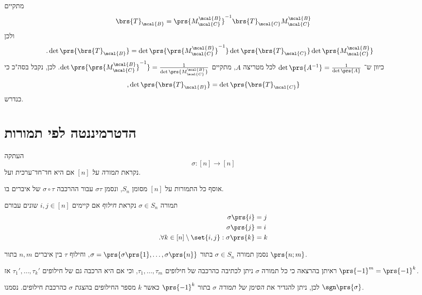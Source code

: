 \documentclass[a4paper,10pt,twoside,openany]{book}
\begin{document}
\begin{solution}
מתקיים
\begin{align*}
\brs{T}_\mcal{B} = \prs{M^\mcal{B}_\mcal{C}}^{-1} \brs{T}_\mcal{C} M^\mcal{B}_\mcal{C}
\end{align*}
ולכן
\begin{align*}
\text{.} \det\prs{\brs{T}_\mcal{B}} &= \det\prs{\prs{M^\mcal{B}_\mcal{C}}^{-1}} \det\prs{\brs{T}_\mcal{C}} \det\prs{M^\mcal{B}_\mcal{C}}
\end{align*}
כיוון ש־%
$\det\prs{A^{-1}} = \frac{1}{\det\prs{A}}$
 לכל מטריצה
 $A$,
 מתקיים
 $\det\prs{\prs{M^\mcal{B}_\mcal{C}}^{-1}} = \frac{1}{\det\prs{M^\mcal{B}_\mcal{C}}}$.
 לכן, נקבל בסה"כ כי
 \[\text{,} \det\prs{\brs{T}_\mcal{B}} = \det\prs{\brs{T}_\mcal{C}}\]
 כנדרש.
\end{solution}

\section{הדטרמיננטה לפי תמורות}

\begin{definition}
העתקה
\[\sigma \colon [n] \to [n]\]
נקראת
\emph{תמורה על $[n]$}
אם היא חד־חד־ערכית ועל.

אוסף כל התמורות על
$[n]$
מסומן
$S_n$,
ונסמן
$\sigma \tau$
עבור ההרכבה
$\sigma \circ \tau$
של איברים בו.
\end{definition}

\begin{definition}[חילוף]
תמורה
$\sigma \in S_n$
נקראת
\emph{חילוף}
אם קיימים
$i,j \in [n]$
שונים עבורם
\begin{align*}
\sigma\prs{i} &= j \\
\sigma\prs{j} &= i \\
\text{.} \forall k \in [n] \setminus \set{i,j} : \sigma\prs{k} &= k
\end{align*}
\end{definition}

\begin{notation}
נסמן תמורה
$\sigma \in S_n$
בתור
$\sigma = \prs{\sigma\prs{1}, \ldots, \sigma\prs{n}}$,
וחילוף
$\tau$
בין איברים
$n,m$
בתור
$\prs{n;m}$.
\end{notation}

\begin{definition}
ראיתן בהרצאה כי כל תמורה
$\sigma$
ניתן לכתיבה כהרכבה של חילופים
$\tau_1, \ldots, \tau_m$,
וכי אם היא הרכבה גם של חילופים
$\tau_1', \ldots, \tau_k'$
אז
$\prs{-1}^m = \prs{-1}^k$.

לכן, ניתן להגדיר את
\emph{הסימן של תמורה
$\sigma$}
בתור
$\prs{-1}^k$
כאשר
$k$
מספר החילופים בהצגת
$\sigma$
כהרכבת חילופים.
נסמנו
$\sgn\prs{\sigma}$.
\end{definition}
\end{document}
